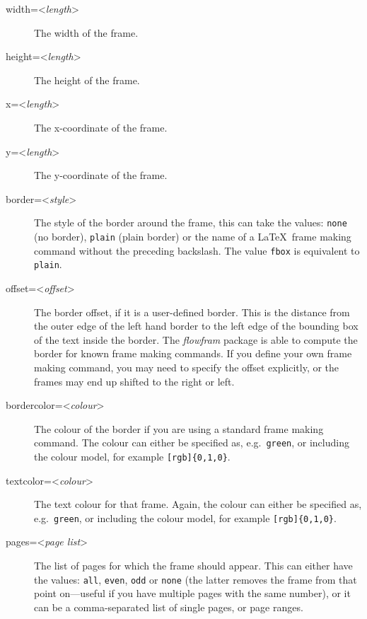 \documentclass[a4paper]{report}
\newcommand{\meta}[1]{\textnormal{\textless\textit{#1}\textgreater}}
\begin{document}
\begin{description}
\item[width=\meta{length}]\mbox{}\par  The width of the frame.

\item[height=\meta{length}]\mbox{}\par The height of the frame.

\item[x=\meta{length}]\mbox{}\par The x-coordinate of the frame.

\item[y=\meta{length}]\mbox{}\par The y-coordinate of the frame.

\item[border=\meta{style}]\mbox{}\par The style of the border around the 
frame, this can take the values: \texttt{none} (no border),
\texttt{plain} (plain border) or the name of a \LaTeX\ 
frame making command without the preceding backslash. 
The value \texttt{fbox} is equivalent to \texttt{plain}.

\item[offset=\meta{offset}]\mbox{}\par The border offset, if it is a 
user-defined border.  This is the distance from the outer
edge of the left hand border to the left edge of the
bounding box of the text inside the border.  The \textsl{flowfram}
package is able to compute the border for 
known frame making commands. 
If you define your own frame making command, you may need to 
specify the offset explicitly, or the frames 
may end up shifted to the right or left.

\item[bordercolor=\meta{colour}]\mbox{}\par The colour of the border
if you are using a standard frame making command.
The colour can either be specified as, e.g.\ \texttt{green},
or including the colour model, for example 
\verb/[rgb]{0,1,0}/.

\item[textcolor=\meta{colour}]\mbox{}\par The text colour for that 
frame. Again, the colour can either be specified as, 
e.g.\ \texttt{green}, or including the colour model, 
for example \verb/[rgb]{0,1,0}/.

\item[pages=\meta{page list}]\mbox{}\par The {list of 
pages} for which the frame
should appear. This can either have the values: \texttt{all},
\texttt{even}, \texttt{odd} or \texttt{none} (the latter 
removes the frame from that point on---useful if you
have multiple pages with the same number), or it can be a 
comma-separated list of single pages, or 
{page ranges}.


\end{description}
\end{document}
